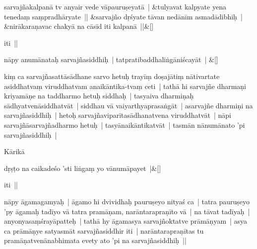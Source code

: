 \documentclass[article,12pt,a4paper]{memoir}%
\newcounter{parCount}
\begin{document}
	    
	    \stanza[\smallbreak]
	  sarvajñakalpanā tv anyair vede vāpauruṣeyatā | &tulyavat kalpyate yena tenedaṃ saṃpradhāryate || &sarvajño dṛśyate tāvan nedānīm asmadādibhiḥ | &nirākaraṇavac chakyā na cāsīd iti kalpanā ||\&[\smallbreak]
	  
	  
	  

	  \pstart \leavevmode%
	iti ||
	{}
	\pend%
      
	    
	    \stanza[\smallbreak]
	  nāpy anumānataḥ sarvajñasiddhiḥ | tatpratibaddhaliṅgāniścayāt | \&[\smallbreak]
	  
	  
	  

	  \pstart \leavevmode%
	\label{thakur75-29.19}kiṃ ca sarvajñasattāsādhane sarvo hetuḥ trayīṃ doṣajātiṃ nātivartate asiddhatvaṃ viruddhatvam anaikāntika-tvaṃ ceti | tathā hi sarvajñe dharmaṇi kriyamāṇe na taddharmo hetuḥ siddhaḥ | tasyaiva dharmiṇaḥ sādhyatvenāsiddhatvāt | siddhau vā vaiyarthyaprasaṅgāt | asarvajñe dharmiṇi na sarvajñasiddhiḥ | hetoḥ sarvajñaviparītasādhanatvena viruddhatvāt | nāpi sarvajñāsarvajñadharmo hetuḥ | tasyānaikāntikatvāt | tasmān nānumānato 'pi sarvajñasiddhiḥ | 
	{}
	\pend%
      

	  \pstart \leavevmode%
	Kārikā
	{}
	\pend%
      
	    
	    \stanza[\smallbreak]
	  dṛṣṭo na caikadeśo 'sti liṅgaṃ yo vānumāpayet |\&[\smallbreak]
	  
	  
	  

	  \pstart \leavevmode%
	iti ||
	{}
	\pend%
      

	  \pstart \leavevmode%
	\label{thakur75-29.27}nāpy āgamagamyaḥ | āgamo hi dvividhaḥ pauruṣeyo nityaś ca | tatra pauruṣeyo 'py āgamaḥ tadīyo vā tatra pramāṇam, narāntarapraṇīto vā | na tāvat tadīyaḥ | anyonyasaṃśrayāpatteḥ | tathā hy āgamasya sarvajñoktatve prāmāṇyam | asya ca prāmāṇye satyasmāt sarvajñasiddhir iti | narāntarapraṇītas tu pramāṇatvenānabhimata evety ato 'pi na sarvajñasiddhiḥ || 
	{}
	\pend%
      
\end{document}
